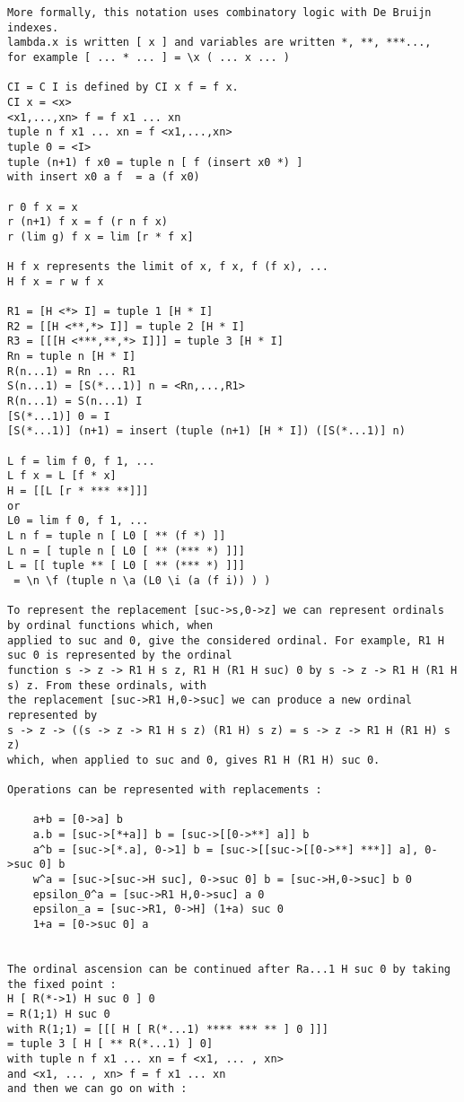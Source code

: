 \documentclass[10pt]{article}
\begin{document}
\begin{verbatim}
More formally, this notation uses combinatory logic with De Bruijn indexes.
lambda.x is written [ x ] and variables are written *, **, ***..., 
for example [ ... * ... ] = \x ( ... x ... ) 

CI = C I is defined by CI x f = f x.
CI x = <x>
<x1,...,xn> f = f x1 ... xn
tuple n f x1 ... xn = f <x1,...,xn>
tuple 0 = <I>
tuple (n+1) f x0 = tuple n [ f (insert x0 *) ]
with insert x0 a f  = a (f x0)

r 0 f x = x
r (n+1) f x = f (r n f x)
r (lim g) f x = lim [r * f x]

H f x represents the limit of x, f x, f (f x), ...
H f x = r w f x

R1 = [H <*> I] = tuple 1 [H * I]
R2 = [[H <**,*> I]] = tuple 2 [H * I]
R3 = [[[H <***,**,*> I]]] = tuple 3 [H * I]
Rn = tuple n [H * I]
R(n...1) = Rn ... R1
S(n...1) = [S(*...1)] n = <Rn,...,R1>
R(n...1) = S(n...1) I
[S(*...1)] 0 = I
[S(*...1)] (n+1) = insert (tuple (n+1) [H * I]) ([S(*...1)] n)

L f = lim f 0, f 1, ...
L f x = L [f * x]
H = [[L [r * *** **]]]
or
L0 = lim f 0, f 1, ...
L n f = tuple n [ L0 [ ** (f *) ]]
L n = [ tuple n [ L0 [ ** (*** *) ]]]
L = [[ tuple ** [ L0 [ ** (*** *) ]]]
 = \n \f (tuple n \a (L0 \i (a (f i)) ) )
 
To represent the replacement [suc->s,0->z] we can represent ordinals by ordinal functions which, when 
applied to suc and 0, give the considered ordinal. For example, R1 H suc 0 is represented by the ordinal 
function s -> z -> R1 H s z, R1 H (R1 H suc) 0 by s -> z -> R1 H (R1 H s) z. From these ordinals, with 
the replacement [suc->R1 H,0->suc] we can produce a new ordinal represented by 
s -> z -> ((s -> z -> R1 H s z) (R1 H) s z) = s -> z -> R1 H (R1 H) s z) 
which, when applied to suc and 0, gives R1 H (R1 H) suc 0.

Operations can be represented with replacements :

    a+b = [0->a] b
    a.b = [suc->[*+a]] b = [suc->[[0->**] a]] b
    a^b = [suc->[*.a], 0->1] b = [suc->[[suc->[[0->**] ***]] a], 0->suc 0] b
    w^a = [suc->[suc->H suc], 0->suc 0] b = [suc->H,0->suc] b 0
    epsilon_0^a = [suc->R1 H,0->suc] a 0
    epsilon_a = [suc->R1, 0->H] (1+a) suc 0
    1+a = [0->suc 0] a 


The ordinal ascension can be continued after Ra...1 H suc 0 by taking the fixed point :
H [ R(*->1) H suc 0 ] 0
= R(1;1) H suc 0
with R(1;1) = [[[ H [ R(*...1) **** *** ** ] 0 ]]]
= tuple 3 [ H [ ** R(*...1) ] 0]
with tuple n f x1 ... xn = f <x1, ... , xn>
and <x1, ... , xn> f = f x1 ... xn
and then we can go on with :


\end{verbatim}
\end{document}
